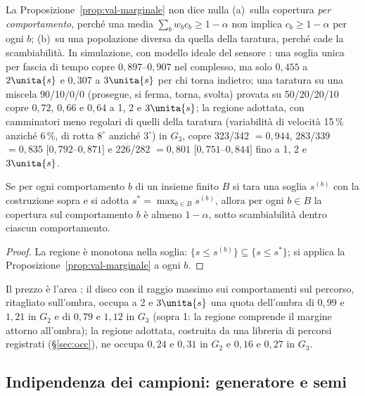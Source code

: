 \begin{osservazione}\label{oss:val-nonvale}
La Proposizione~\ref{prop:val-marginale} non dice nulla (a)~sulla copertura \emph{per comportamento}, perché una media $\sum_bw_bc_b\ge1-\alpha$ non implica $c_b\ge1-\alpha$ per ogni $b$; (b)~su una popolazione diversa da quella della taratura, perché cade la scambiabilità. In simulazione, con modello ideale del sensore : una soglia unica per fascia di tempo copre $0{,}897$–$0{,}907$ nel complesso, ma solo $0{,}455$ a $2\unita{s}$ e $0{,}307$ a $3\unita{s}$ per chi torna indietro; una taratura su una miscela 90/10/0/0 (prosegue, si ferma, torna, svolta) provata su 50/20/20/10 copre $0{,}72$, $0{,}66$ e $0{,}64$ a 1, 2 e $3\unita{s}$; la regione adottata, con camminatori meno regolari di quelli della taratura (variabilità di velocità 15\,\% anziché 6\,\%, di rotta $8^\circ$ anziché $3^\circ$) in $G_3$, copre 323/342 $=0{,}944$, 283/339 $=0{,}835$ $[0{,}792$–$0{,}871]$ e 226/282 $=0{,}801$ $[0{,}751$–$0{,}844]$ fino a 1, 2 e $3\unita{s}$.
\end{osservazione}

\begin{proposizione}\label{prop:val-suolo}
Se per ogni comportamento $b$ di un insieme finito $B$ si tara una soglia $s^{(b)}$ con la costruzione sopra e si adotta $s^\ast=\max_{b\in B}s^{(b)}$, allora per ogni $b\in B$ la copertura sul comportamento $b$ è almeno $1-\alpha$, sotto scambiabilità dentro ciascun comportamento. 
\end{proposizione}
\begin{proof}
La regione è monotona nella soglia: $\{s\le s^{(b)}\}\subseteq\{s\le s^\ast\}$; si applica la Proposizione~\ref{prop:val-marginale} a ogni $b$.
\end{proof}
Il prezzo è l'area : il disco con il raggio massimo sui comportamenti sul percorso, ritagliato sull'ombra, occupa a 2 e $3\unita{s}$ una quota dell'ombra di $0{,}99$ e $1{,}21$ in $G_2$ e di $0{,}79$ e $1{,}12$ in $G_3$ (sopra 1: la regione comprende il margine attorno all'ombra); la regione adottata, costruita da una libreria di percorsi registrati (\S\ref{sec:occ}), ne occupa $0{,}24$ e $0{,}31$ in $G_2$ e $0{,}16$ e $0{,}27$ in $G_3$.

\subsection{Indipendenza dei campioni: generatore e semi}\label{sec:val-semi}

